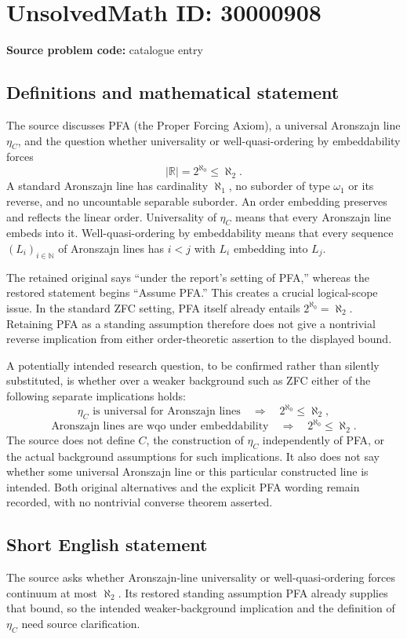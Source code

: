 \documentclass[11pt]{article}
\newcommand{\N}{\mathbb{N}}
\newcommand{\R}{\mathbb{R}}
\begin{document}
\section*{UnsolvedMath ID: 30000908}
\textbf{Source problem code:} catalogue entry
\subsection{Definitions and mathematical statement}
The source discusses PFA (the Proper Forcing Axiom), a universal Aronszajn line $\eta_C$, and the question whether universality or well-quasi-ordering by embeddability forces
\[
 |\R|=2^{\aleph_0}\le\aleph_2.
\]
A standard Aronszajn line has cardinality $\aleph_1$, no suborder of type $\omega_1$ or its reverse, and no uncountable separable suborder. An order embedding preserves and reflects the linear order. Universality of $\eta_C$ means that every Aronszajn line embeds into it. Well-quasi-ordering by embeddability means that every sequence $(L_i)_{i\in\N}$ of Aronszajn lines has $i<j$ with $L_i$ embedding into $L_j$.

The retained original says ``under the report's setting of PFA,'' whereas the restored statement begins ``Assume PFA.'' This creates a crucial logical-scope issue. In the standard ZFC setting, PFA itself already entails $2^{\aleph_0}=\aleph_2$. Retaining PFA as a standing assumption therefore does not give a nontrivial reverse implication from either order-theoretic assertion to the displayed bound.

A potentially intended research question, to be confirmed rather than silently substituted, is whether over a weaker background such as ZFC either of the following separate implications holds:
\[
 \eta_C\text{ is universal for Aronszajn lines}
      \quad\Longrightarrow\quad2^{\aleph_0}\le\aleph_2,
\]
\[
 \text{Aronszajn lines are wqo under embeddability}
      \quad\Longrightarrow\quad2^{\aleph_0}\le\aleph_2.
\]
The source does not define $C$, the construction of $\eta_C$ independently of PFA, or the actual background assumptions for such implications. It also does not say whether some universal Aronszajn line or this particular constructed line is intended. Both original alternatives and the explicit PFA wording remain recorded, with no nontrivial converse theorem asserted.
\subsection{Short English statement}
The source asks whether Aronszajn-line universality or well-quasi-ordering forces continuum at most $\aleph_2$. Its restored standing assumption PFA already supplies that bound, so the intended weaker-background implication and the definition of $\eta_C$ need source clarification.
\end{document}
